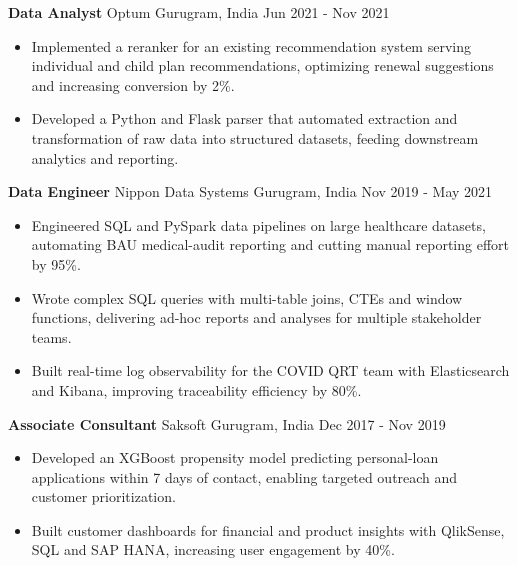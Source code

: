 \documentclass[10pt,a4paper]{article}
\newcommand{\role}[4]{\textbf{#1} \textbar{} #2 \hfill #3 \textbar{} #4\par}
\begin{document}
\vspace{3pt}
\role{Data Analyst}{Optum}{Gurugram, India}{Jun 2021 - Nov 2021}
\begin{itemize}
  \item Implemented a reranker for an existing recommendation system serving individual and child plan recommendations, optimizing renewal suggestions and increasing conversion by 2\%.
  \item Developed a Python and Flask parser that automated extraction and transformation of raw data into structured datasets, feeding downstream analytics and reporting.
\end{itemize}
\vspace{3pt}
\role{Data Engineer}{Nippon Data Systems}{Gurugram, India}{Nov 2019 - May 2021}
\begin{itemize}
  \item Engineered SQL and PySpark data pipelines on large healthcare datasets, automating BAU medical-audit reporting and cutting manual reporting effort by 95\%.
  \item Wrote complex SQL queries with multi-table joins, CTEs and window functions, delivering ad-hoc reports and analyses for multiple stakeholder teams.
  \item Built real-time log observability for the COVID QRT team with Elasticsearch and Kibana, improving traceability efficiency by 80\%.
\end{itemize}
\vspace{3pt}
\role{Associate Consultant}{Saksoft}{Gurugram, India}{Dec 2017 - Nov 2019}
\begin{itemize}
  \item Developed an XGBoost propensity model predicting personal-loan applications within 7 days of contact, enabling targeted outreach and customer prioritization.
  \item Built customer dashboards for financial and product insights with QlikSense, SQL and SAP HANA, increasing user engagement by 40\%.
\end{itemize}
\end{document}
